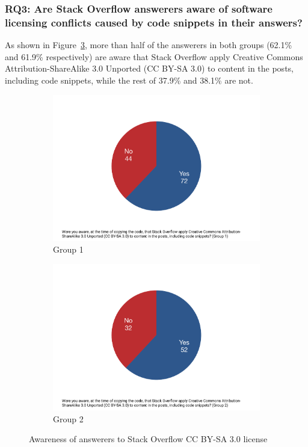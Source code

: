 \documentclass{svjour3}                     %
\begin{document}
\vspace{0.5cm} \noindent{}
\vspace{0.5cm}

\subsubsection*{RQ3: Are Stack Overflow answerers aware of software licensing
	conflicts caused by code snippets in their answers?}

As shown in Figure~\ref{fig:survey_license_known}, more than half of the
answerers in both groups (62.1\% and 61.9\% respectively) are aware that Stack
Overflow apply Creative Commons Attribution-ShareAlike 3.0 Unported (CC BY-SA
3.0) to content in the posts, including code snippets, while the rest of 37.9\%
and 38.1\% are not. 

\begin{figure}
	\begin{subfigure}{.5\textwidth}
		\centering
		\includegraphics[width=.4\linewidth]{survey_license_known_1}
		\caption{Group 1}
		\label{fig:survey_license_known_1}
	\end{subfigure}%
	\begin{subfigure}{.5\textwidth}
		\centering
		\includegraphics[width=.4\linewidth]{survey_license_known_2}
		\caption{Group 2}
		\label{fig:survey_license_known_2}
	\end{subfigure}
	\caption{Awareness of answerers to Stack Overflow CC BY-SA 3.0 license}
	\label{fig:survey_license_known}
\end{figure}
\end{document}
